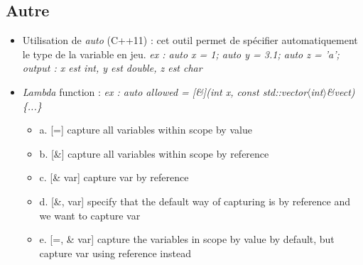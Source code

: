 \documentclass[12pt,a4paper]{article}
\begin{document}
\subsection{Autre}
\begin{itemize}
\item Utilisation de \textit{auto} (C++11) : cet outil permet de spécifier automatiquement le type de la variable en jeu. 
\newline \textit{ex : auto x = 1; auto y = 3.1; auto z = 'a';}
\newline \textit{output : x est int, y est double, z est char}
\item \textit{Lambda} function : \textit{ex : auto allowed = [\&](int x, const std::vector$\langle$int$\rangle$\&vect)\{...\}}
\begin{itemize}
\item a. [=] capture all variables within scope by value
\item b. [\&] capture all variables within scope by reference
\item c. [\& var] capture var by reference
\item d. [\&, var] specify that the default way of capturing is by reference and we want to capture var
\item e. [=, \& var] capture the variables in scope by value by default, but capture var using reference instead
\end{itemize}
\end{itemize}
\end{document}
